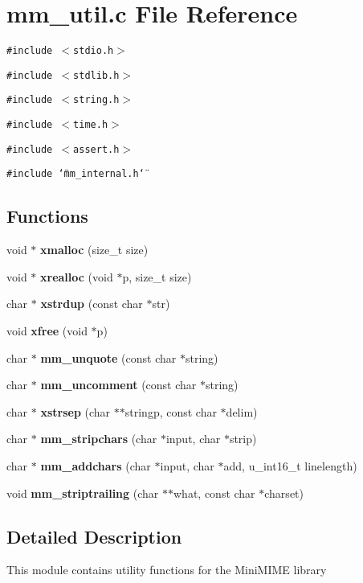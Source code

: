 \section{mm\_\-util.c File Reference}
\label{mm__util_8c}
{\tt \#include $<$stdio.h$>$}\par
{\tt \#include $<$stdlib.h$>$}\par
{\tt \#include $<$string.h$>$}\par
{\tt \#include $<$time.h$>$}\par
{\tt \#include $<$assert.h$>$}\par
{\tt \#include \char`\"{}mm\_\-internal.h\char`\"{}}\par
\subsection*{Functions}
\begin{CompactItemize}
\item 
void $\ast$ {\bf xmalloc} (size\_\-t size)
\item 
void $\ast$ {\bf xrealloc} (void $\ast$p, size\_\-t size)
\item 
char $\ast$ \textbf{xstrdup} (const char $\ast$str)\label{mm__util_8c_700bf3013e33311eacdd1f20d13bdc9a}

\item 
void \textbf{xfree} (void $\ast$p)\label{mm__util_8c_91fc771d8aa78ca2ac43244c491da52d}

\item 
char $\ast$ {\bf mm\_\-unquote} (const char $\ast$string)
\item 
char $\ast$ {\bf mm\_\-uncomment} (const char $\ast$string)
\item 
char $\ast$ {\bf xstrsep} (char $\ast$$\ast$stringp, const char $\ast$delim)
\item 
char $\ast$ {\bf mm\_\-stripchars} (char $\ast$input, char $\ast$strip)
\item 
char $\ast$ {\bf mm\_\-addchars} (char $\ast$input, char $\ast$add, u\_\-int16\_\-t linelength)
\item 
void \textbf{mm\_\-striptrailing} (char $\ast$$\ast$what, const char $\ast$charset)\label{mm__util_8c_a965d3d1c625253beffd53051b38548e}

\end{CompactItemize}


\subsection{Detailed Description}
This module contains utility functions for the Mini\-MIME library 